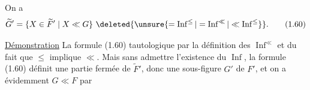 On a
\begingroup\makeatletter\tagsleft@true\makeatother
\[
\widetilde G'=\{X\in\widetilde F'\mid X\ll G\}\ \deleted{\unsure{=\operatorname{Inf}^{\leq}|=\operatorname{Inf}^{\ll}|\ll\operatorname{Inf}^{\leq}}}.\tag*{(1.60)}
\]
\endgroup

\uline{Démonstration} La formule (1.60)   tautologique par la définition des $\operatorname{Inf}^{\ll}$ et du fait que $\leq$ implique $\ll$. Mais sans admettre l'existence du $\operatorname{Inf}$, la formule (1.60) définit une partie fermée de $\widetilde F'$, donc une sous-figure $G'$ de $F'$, et on a évidemment $G\ll F$ par
